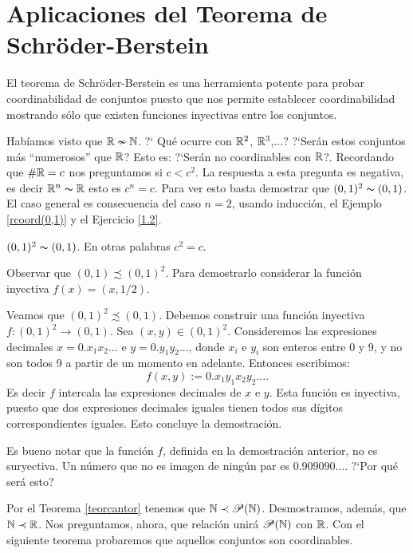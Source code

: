 \section{Aplicaciones del Teorema de Schr\"oder-Berstein}

El teorema de Schr\"oder-Berstein es una herramienta potente para
probar coordinabilidad de conjuntos puesto que nos permite establecer coordinabilidad mostrando sólo que existen funciones inyectivas entre los conjuntos.

Habíamos visto
que $\mathbb{R}\nsim\mathbb{N}$. ?` Qué ocurre con $\mathbb{R}^2$, $\mathbb{R}^3$,...?
?`Serán estos conjuntos más ``numerosos'' que $\mathbb{R}$? Esto es:
?`Serán no coordinables con $\mathbb{R}$?. Recordando que $\#\mathbb{R}=c$ nos preguntamos si $c<c^2$. La respuesta a esta
pregunta es negativa, es decir $\mathbb{R}^n\thicksim\mathbb{R}$ esto es $c^n=c$. Para ver esto
basta demostrar que $(0,1)^2\thicksim (0,1)$. El caso general es
consecuencia del caso $n=2$, usando inducción, el Ejemplo
\vref{rcoord(0,1)} y el Ejercicio \vref{1.2}.

\begin{teorema}{} $(0,1)^2\thicksim (0,1)$. En otras palabras $c^2=c$. 
\end{teorema}
\begin{demo} Observar que $(0,1)\precsim (0,1)^2$. Para
demostrarlo considerar la función inyectiva $f(x)=(x,1/2)$.

Veamos que $(0,1)^2\precsim (0,1)$. Debemos construir una
función inyectiva $f:(0,1)^2\longrightarrow (0,1)$. Sea
$(x,y)\in (0,1)^2$. Consideremos las expresiones decimales
$x=0.x_1x_2...$ e $y=0.y_1y_2...$, donde $x_i$ e $y_i$ son enteros
entre 0 y 9, y no son todos 9 a partir de un momento en adelante.
Entonces escribimos:
\[f(x,y):=0.x_1y_1x_2y_2....\]
Es decir $f$ intercala las expresiones decimales de $x$ e $y$.
Esta función es inyectiva, puesto que dos expresiones decimales
iguales tienen todos sus dígitos correspondientes iguales.
Esto concluye la demostración.
\end{demo}

Es bueno notar que la función $f$, definida en la demostración
anterior, no es suryectiva. Un número que no es imagen de
ningún par es $0.909090...$. ?`Por qué será esto?

Por el Teorema \vref{teorcantor} tenemos que
$\mathbb{N}\prec\mathscr{P}(\mathbb{N})$. Desmostramos, además, que $\mathbb{N}\prec
\mathbb{R}$. Nos preguntamos, ahora, que relación unirá
$\mathscr{P}(\mathbb{N})$ con $\mathbb{R}$. Con el siguiente teorema probaremos
que aquellos conjuntos son coordinables.

